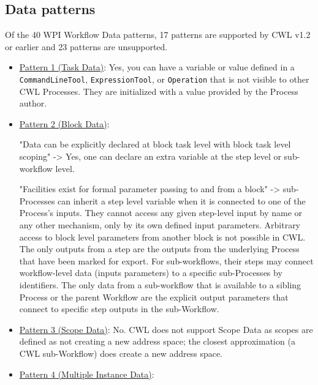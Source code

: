 \subsection{Data patterns}

Of the 40 WPI Workflow Data patterns, 17 patterns are supported by CWL v1.2 or earlier and 23 patterns are unsupported.

\begin{itemize}
\item \href{http://www.workflowpatterns.com/patterns/data/visibility/wdp1.php}{Pattern 1 (Task Data)}: Yes, you can have a variable or value defined in a \verb|CommandLineTool|, \verb|ExpressionTool|, or \verb|Operation| that is not visible to other CWL Processes. They are initialized with a value provided by the Process author.

\item \href{http://www.workflowpatterns.com/patterns/data/visibility/wdp2.php}{Pattern 2 (Block Data)}:

"Data can be explicitly declared at block task level with block task level scoping" -> Yes, one can declare an extra variable at the step level or sub-workflow level.

"Facilities exist for formal parameter passing to and from a block" -> sub-Processes can inherit a step level variable when it is connected to one of the Process’s inputs. They cannot access any given step-level input by name or any other mechanism, only by its own defined input parameters. Arbitrary access to block level parameters from another block is not possible in CWL. The only outputs from a step are the outputs from the underlying Process that have been marked for export. For sub-workflows, their steps may connect workflow-level data (inputs parameters) to a specific sub-Processes by identifiers. The only data from a sub-workflow that is available to a sibling Process or the parent Workflow are the explicit output parameters that connect to specific step outputs in the sub-Workflow.

\item \href{http://www.workflowpatterns.com/patterns/data/visibility/wdp3.php}{Pattern 3 (Scope Data)}: No. CWL does not support Scope Data as scopes are defined as not creating a new address space; the closest approximation (a CWL sub-Workflow) does create a new address space.

\item \href{http://www.workflowpatterns.com/patterns/data/visibility/wdp4.php}{Pattern 4 (Multiple Instance Data)}: 


\end{itemize}
